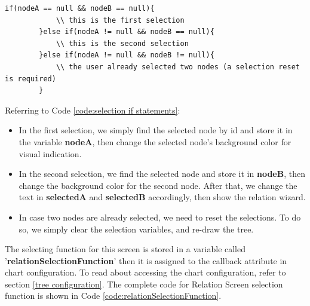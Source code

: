 \documentclass[11pt]{article} %
\begin{document}
\noindent
\begin{minipage}[c]{\linewidth}
\begin{lstlisting}[basicstyle=\scriptsize, tabsize=4, frame=single, caption=Detect the order of selection, label=code:selection if statements]
		if(nodeA == null && nodeB == null){
			\\ this is the first selection
		}else if(nodeA != null && nodeB == null){
			\\ this is the second selection
		}else if(nodeA != null && nodeB != null){
			\\ the user already selected two nodes (a selection reset is required)
		}

\end{lstlisting}
\end{minipage}

\noindent
Referring  to Code \ref{code:selection if statements}:
\begin{itemize}
\item In the first selection, we simply find the selected node by id and store it in the variable \textbf{nodeA}, then change the selected node's background color for visual indication.
\item In the second selection, we find the selected node and store it in \textbf{nodeB}, then change the background color for the second node. After that, we change the text in \textbf{selectedA} and \textbf{selectedB} accordingly, then show the relation wizard.
\item In case two nodes are already selected, we need to reset the selections. To do so, we simply clear the selection variables, and re-draw the tree.
\end{itemize}
\noindent
The selecting function for this screen is stored in a variable called '\textbf{relationSelectionFunction}' then it is assigned to the callback attribute in chart configuration. To read about accessing the chart configuration, refer to section \ref{tree configuration}.
The complete code for Relation Screen selection function is shown in Code \ref{code:relationSelectionFunction}.
\end{document}
